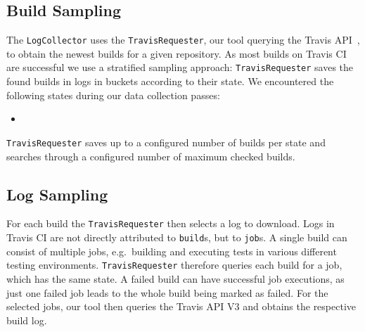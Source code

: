 \documentclass[\myrootdir/main.tex]{subfiles}
\begin{document}
\subsection{Build Sampling}
The \texttt{LogCollector} uses the \texttt{TravisRequester}, our tool querying the Travis API~\cite{travisci2019apidoc}, to obtain the newest builds for a given repository.
As most builds on Travis CI are successful  we use a stratified sampling approach: \texttt{TravisRequester} saves the found builds in logs in buckets according to their state.
We encountered the following states during our data collection passes:
\begin{itemize}
	\item {}
\end{itemize}
\texttt{TravisRequester} saves up to a configured number of builds per state and searches through a configured number of maximum checked builds.

\subsection{Log Sampling}
For each build the \texttt{TravisRequester} then selects a log to download.
Logs in Travis CI are not directly attributed to \texttt{build}s, but to \texttt{job}s.
A single build can consist of multiple jobs, e.g.\ building and executing tests in various different testing environments.
\texttt{TravisRequester} therefore queries each build for a job, which has the same state.
A failed build can have successful job executions, as just one failed job leads to the whole build being marked as failed.
For the selected jobs, our tool then queries the Travis API V3 and obtains the respective build log.


\end{document}
